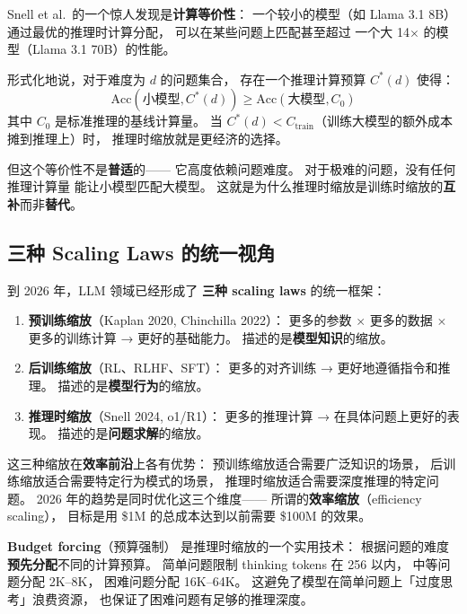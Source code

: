 \begin{whybox}[推理时缩放的数学等价性]
Snell et al.\ 的一个惊人发现是\textbf{计算等价性}：
一个较小的模型（如 Llama 3.1 8B）
通过最优的推理时计算分配，
可以在某些问题上匹配甚至超过
一个大 14$\times$ 的模型（Llama 3.1 70B）的性能。

形式化地说，对于难度为 $d$ 的问题集合，
存在一个推理计算预算 $C^*(d)$ 使得：
\begin{equation}
  \text{Acc}(\text{小模型}, C^*(d)) \geq \text{Acc}(\text{大模型}, C_0)
\end{equation}
其中 $C_0$ 是标准推理的基线计算量。
当 $C^*(d) < C_{\text{train}}$（训练大模型的额外成本摊到推理上）时，
推理时缩放就是更经济的选择。

但这个等价性不是\textbf{普适}的——
它高度依赖问题难度。
对于极难的问题，没有任何推理计算量
能让小模型匹配大模型。
这就是为什么推理时缩放是训练时缩放的\textbf{互补}而非\textbf{替代}。
\end{whybox}

\subsection{三种 Scaling Laws 的统一视角}

到 2026 年，LLM 领域已经形成了
\textbf{三种 scaling laws} 的统一框架：

\begin{enumerate}[noitemsep]
  \item \textbf{预训练缩放}（Kaplan 2020, Chinchilla 2022）：
        更多的参数 $\times$ 更多的数据 $\times$ 更多的训练计算
        → 更好的基础能力。
        描述的是\textbf{模型知识}的缩放。
  \item \textbf{后训练缩放}（RL、RLHF、SFT）：
        更多的对齐训练 → 更好地遵循指令和推理。
        描述的是\textbf{模型行为}的缩放。
  \item \textbf{推理时缩放}（Snell 2024, o1/R1）：
        更多的推理计算 → 在具体问题上更好的表现。
        描述的是\textbf{问题求解}的缩放。
\end{enumerate}

这三种缩放在\textbf{效率前沿}上各有优势：
预训练缩放适合需要广泛知识的场景，
后训练缩放适合需要特定行为模式的场景，
推理时缩放适合需要深度推理的特定问题。
2026 年的趋势是同时优化这三个维度——
所谓的\textbf{效率缩放}（efficiency scaling），
目标是用 \$1M 的总成本达到以前需要 \$100M 的效果。

\textbf{Budget forcing}（预算强制）
是推理时缩放的一个实用技术：
根据问题的难度\textbf{预先分配}不同的计算预算。
简单问题限制 thinking tokens 在 256 以内，
中等问题分配 2K--8K，
困难问题分配 16K--64K。
这避免了模型在简单问题上「过度思考」浪费资源，
也保证了困难问题有足够的推理深度。


